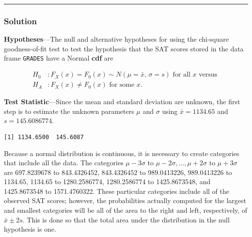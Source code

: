 \documentclass[
]{article}
\newenvironment{Shaded}{\begin{snugshade}}{\end{snugshade}}
\newcommand{\FunctionTok}[1]{\textcolor[rgb]{0.00,0.00,0.00}{#1}}
\newcommand{\NormalTok}[1]{#1}
\newcommand{\OtherTok}[1]{\textcolor[rgb]{0.56,0.35,0.01}{#1}}
\newcommand{\SpecialCharTok}[1]{\textcolor[rgb]{0.00,0.00,0.00}{#1}}
\begin{document}
\begin{center}\rule{0.5\linewidth}{0.5pt}\end{center}

\hypertarget{solution-1}{%
\subsubsection*{Solution}\label{solution-1}}

\textbf{Hypotheses}---The null and alternative hypotheses for using the chi-square goodness-of-fit test to test the hypothesis that the SAT scores stored in the data frame \texttt{GRADES} have a Normal \textbf{cdf} are

\begin{align*}
        H_0&: F_X(x) = F_0(x) \sim N(\mu=\bar{x},\, \sigma=s)\text{ for all } x \text{ versus
        }\\
        H_A&:  F_X(x) \ne F_0(x)\text{ for some } x.
\end{align*}

\textbf{Test Statistic}---Since the mean and standard deviation are unknown, the first step is to estimate the unknown parameters \(\mu\) and \(\sigma\) using \(\bar{x}=1134.65\) and \(s=145.6086774\).

\begin{Shaded}
\end{Shaded}

\begin{verbatim}
[1] 1134.6500  145.6087
\end{verbatim}

Because a normal distribution is continuous, it is necessary to create categories that include all the data. The categories \(\mu - 3\sigma\) to \(\mu -2\sigma, \ldots, \mu +2\sigma\) to \(\mu + 3\sigma\) are 697.8239678 to 843.4326452, 843.4326452 to 989.0413226, 989.0413226 to 1134.65,
1134.65 to
1280.2586774, 1280.2586774 to 1425.8673548, and 1425.8673548 to 1571.4760322. These particular categories include all of the observed SAT scores; however, the probabilities actually computed for the largest and smallest categories will be all of the area to the right and left, respectively, of \(\bar{x} \pm 2s\). This is done so that the total area under the distribution in the null hypothesis is one.
\end{document}
